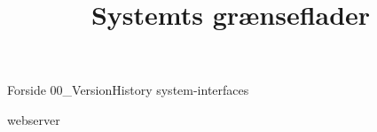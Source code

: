 \documentclass[a4paper,openany]{memoir}
\title{Systemts grænseflader}
\begin{document}
	{Forside}  \newpage
	\tableofcontents\thispagestyle{fancy}
	{00_VersionHistory}  \newpage
	{system-interfaces}  \newpage

	{webserver}  \newpage
	 {}
	\printbibliography
\end{document}
